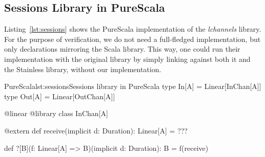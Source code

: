 \documentclass[a4paper,twoside]{article}
\newcommand{\RefCode}[1]{Listing~\ref{#1}}
\newcommand{\stt}[1]{\texttt{\small{#1}}}
\begin{document}
\begin{enumerate}
% 
%
%
%

\subsection{Sessions Library in PureScala}
\label{sessions_lib}

\RefCode{lst:sessions} shows the PureScala implementation of the \textit{lchannels} library. For the purpose of verification, we do not need a full-fledged implementation, but only declarations mirroring the Scala library. This way, one could run their implementation with the original library by simply linking against both it and the Stainless library, without our implementation.

\begin{Code}{PureScala}{lst:sessions}{Sessions library in PureScala}
type In[A]  = Linear[InChan[A]]
type Out[A] = Linear[OutChan[A]]

@linear @library
class InChan[A] {

  @extern
  def receive(implicit d: Duration): Linear[A] = {
    ???
  }

  def ?[B](f: Linear[A] => B)(implicit d: Duration): B = {
    f(receive)
  }
}


\end{Code}
\end{enumerate}
\end{document}
